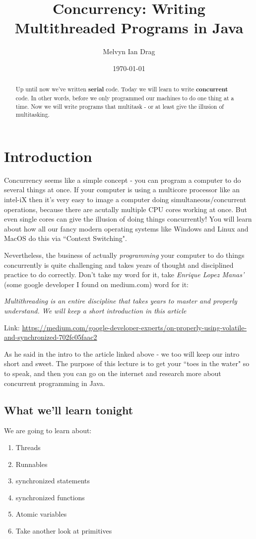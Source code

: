 \documentclass[12pt]{article}
\title{Concurrency: Writing Multithreaded Programs in Java}
\author{
	Melvyn Ian Drag
}
\date{\today}
\begin{document}
\maketitle

\begin{abstract}
Up until now we've written \textbf{serial} code. Today we will learn to write
\textbf{concurrent} code. In other words, before we only programmed our machines
to do one thing at a time. Now we will write programs that multitask - or at
least give the illusion of multitasking.
\end{abstract}

\section{Introduction}
Concurrency seems like a simple concept - you can program a computer to do
several things at once. If your computer is using a multicore processor like an
intel-iX then it's very easy to image a computer doing simultaneous/concurrent
operations, because there are acutally multiple CPU cores working at once. But
even single cores can give the illusion of doing things concurrently! You will
learn about how all our fancy modern operating systems like Windows and Linux
and MacOS do this via ``Context Switching".

Nevertheless, the business of actually \textit{programming} your computer to do
things concurrently is quite challenging and takes years of thought and
disciplined practice to do correctly. Don't take my word for it, take
\textit{Enrique Lopez Manas'} (some google developer I found on medium.com) word
for it:

\textit{Multithreading is an entire discipline that takes years to master and
properly understand. We will keep a short introduction in this article}

Link:
\url{https://medium.com/google-developer-experts/on-properly-using-volatile-and-synchronized-702fc05faac2}

As he said in the intro to the article linked above - we too will keep our intro
short and sweet. The purpose of this lecture is to get your ``toes in the water"
so to speak, and then you can go on the internet and research more about
concurrent programming in Java. 

\subsection{What we'll learn tonight}
We are going to learn about:
\begin{enumerate}
\item Threads
\item Runnables
\item synchronized statements
\item synchronized functions
\item Atomic variables
\item Take another look at primitives
\end{enumerate}
\end{document}
